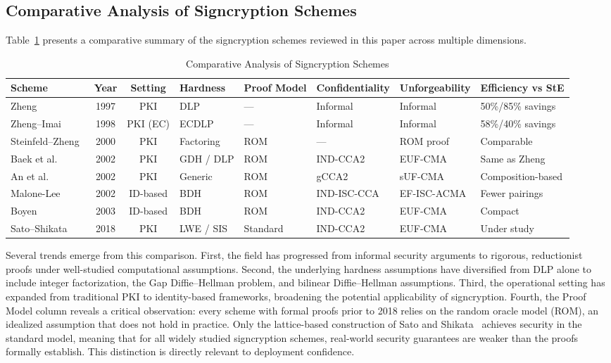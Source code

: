 \documentclass[conference]{IEEEtran}
\begin{document}
\subsection{Comparative Analysis of Signcryption Schemes}

Table~\ref{tab:comparison} presents a comparative summary of the signcryption schemes reviewed in this paper across multiple dimensions.

\begin{table}[t]
\centering
\caption{Comparative Analysis of Signcryption Schemes}
\label{tab:comparison}
\begin{tabular}{@{}lcclllll@{}}
\toprule
\textbf{Scheme} & \textbf{Year} & \textbf{Setting} & \textbf{Hardness} & \textbf{Proof Model} & \textbf{Confidentiality} & \textbf{Unforgeability} & \textbf{Efficiency vs StE} \\
\midrule
Zheng~\cite{zheng1997} & 1997 & PKI & DLP & --- & Informal & Informal & 50\%/85\% savings \\
Zheng--Imai~\cite{zheng1998} & 1998 & PKI (EC) & ECDLP & --- & Informal & Informal & 58\%/40\% savings \\
Steinfeld--Zheng~\cite{steinfeld2000} & 2000 & PKI & Factoring & ROM & --- & ROM proof & Comparable \\
Baek et al.~\cite{baek2002,baek2007} & 2002 & PKI & GDH / DLP & ROM & IND-CCA2 & EUF-CMA & Same as Zheng \\
An et al.~\cite{an2002} & 2002 & PKI & Generic & ROM & gCCA2 & sUF-CMA & Composition-based \\
Malone-Lee~\cite{malonelee2002} & 2002 & ID-based & BDH & ROM & IND-ISC-CCA & EF-ISC-ACMA & Fewer pairings \\
Boyen~\cite{boyen2003} & 2003 & ID-based & BDH & ROM & IND-CCA2 & EUF-CMA & Compact \\
Sato--Shikata~\cite{sato2018} & 2018 & PKI & LWE / SIS & Standard & IND-CCA2 & EUF-CMA & Under study \\
\bottomrule
\end{tabular}
\end{table}

Several trends emerge from this comparison. First, the field has progressed from informal security arguments to rigorous, reductionist proofs under well-studied computational assumptions. Second, the underlying hardness assumptions have diversified from DLP alone to include integer factorization, the Gap Diffie--Hellman problem, and bilinear Diffie--Hellman assumptions. Third, the operational setting has expanded from traditional PKI to identity-based frameworks, broadening the potential applicability of signcryption. Fourth, the Proof Model column reveals a critical observation: every scheme with formal proofs prior to 2018 relies on the random oracle model (ROM), an idealized assumption that does not hold in practice. Only the lattice-based construction of Sato and Shikata~\cite{sato2018} achieves security in the standard model, meaning that for all widely studied signcryption schemes, real-world security guarantees are weaker than the proofs formally establish. This distinction is directly relevant to deployment confidence.
\end{document}
